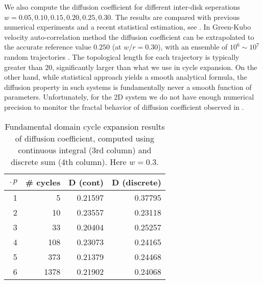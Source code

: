 We also compute the diffusion coefficient for different inter-disk 
seperations $w = 0.05, 0.10, 0.15,
0.20, 0.25, 0.30$. The results are compared with previous numerical
experiments and a recent statistical estimation, see
. In Green-Kubo velocity auto-correlation method
the  diffusion coefficient can be extrapolated to the accurate
reference value $0.250$ (at $w/r=0.30$), with an ensemble of
$10^6\sim10^7$ random trajectories
. The topological length for each trajectory is
typically greater than $20$, significantly larger than what we use 
in cycle expansion. On the other 
hand, while
statistical approach yields a smooth analytical formula,
the diffusion property in such systems is fundamentally never a 
smooth function of parameters. Unfortunately, for 
the 2D system we do not have enough numerical precision to monitor 
the fractal behavior of diffusion coefficient observed in 
. 

\begin{table}[htbp]
	\centering
	\begin{tabular}{|r|r|r|r||}
		\hline
		$\period{p}$ & \# cycles & D (cont) & D (discrete) \\ 
		\hline\hline
		1      & 5      & 0.21597 & 0.37795 \\
		2      & 10     & 0.23557 & 0.23118 \\
		3      & 33     & 0.20404 & 0.25257 \\
		4      & 108    & 0.23073 & 0.24165 \\
		5      & 373    & 0.21379 & 0.24468 \\
		6      & 1378   & 0.21902 & 0.24068 \\ 
		\hline
	\end{tabular}
	\caption[Fundamental domain cycle expansion results of diffusion 
	coefficient]{\label{TCELL3}
		Fundamental domain cycle expansion results of diffusion 
		coefficient, computed using continuous integral (3rd column) 
		and discrete sum (4th column). Here $w = 0.3$.
	}
\end{table}

